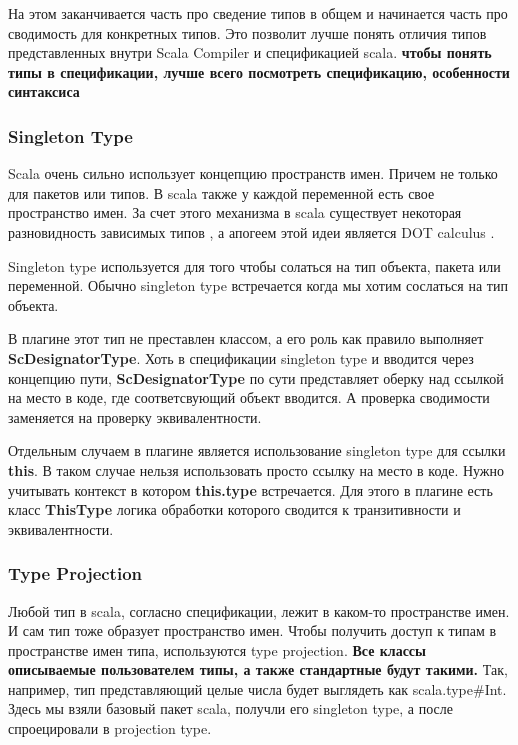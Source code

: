 На этом заканчивается часть про сведение типов в общем и начинается часть про
сводимость для конкретных типов.
Это позволит лучше понять отличия типов представленных внутри Scala Compiler
и спецификацией scala.
\textbf{чтобы понять типы в спецификации, лучше всего посмотреть спецификацию,
особенности синтаксиса}

%

\subsubsection{Singleton Type}
Scala очень сильно использует концепцию пространств имен.
Причем не только для пакетов или типов.
В scala также у каждой переменной есть свое пространство имен.
За счет этого механизма в scala существует некоторая разновидность зависимых
типов \cite{dependent_types}, а апогеем этой идеи является DOT calculus
\cite{dot_calculus}.

Singleton type используется для того чтобы солаться на тип объекта, пакета или
переменной.
Обычно singleton type встречается когда мы хотим сослаться на тип объекта.

В плагине этот тип не преставлен классом, а его роль как правило выполняет
\textbf{ScDesignatorType}.
Хоть в спецификации singleton type и вводится через концепцию пути,
\textbf{ScDesignatorType} по сути представляет оберку над ссылкой на место в коде,
где соответсвующий объект вводится.
А проверка сводимости заменяется на проверку эквивалентности.

Отдельным случаем в плагине является использование singleton type для ссылки
\textbf{this}.
В таком случае нельзя использовать просто ссылку на место в коде.
Нужно учитывать контекст в котором \textbf{this.type} встречается.
Для этого в плагине есть класс \textbf{ThisType} логика обработки которого
сводится к транзитивности и эквивалентности.


\subsubsection{Type Projection}

Любой тип в scala, согласно спецификации, лежит в каком-то пространстве имен.
И сам тип тоже образует пространство имен.
Чтобы получить доступ к типам в пространстве имен типа, используются
type projection.
\textbf{Все классы описываемые пользователем типы, а также стандартные будут такими.}
Так, например, тип представляющий целые числа будет выглядеть как
scala.type\#Int.
Здесь мы взяли базовый пакет scala, получли его singleton type, а после
спроецировали в projection type.

